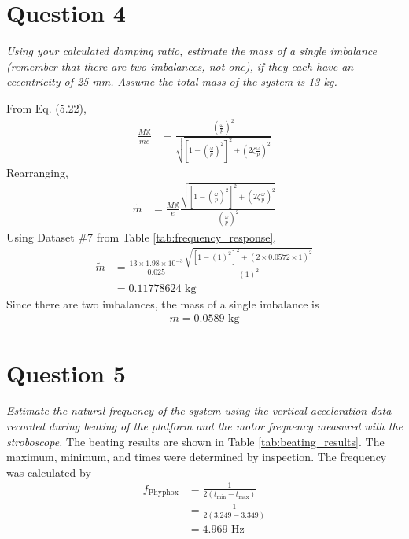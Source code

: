 \section{Question 4}
\textit{Using your calculated damping ratio, estimate the mass of a single imbalance (remember that there are two imbalances, not one), if they each have an eccentricity of 25 mm. Assume the total mass of the system is 13 kg.}

From Eq. (5.22),
\begin{align*}
    \frac{M \mathbb{X}}{\tilde{m}e} &= \frac{\left(\frac{\omega}{p}\right)^2}{\sqrt{\left[1 - \left(\frac{\omega}{p}\right)^2\right]^2 + \left(2\zeta\frac{\omega}{p}\right)^2}} 
\end{align*}
Rearranging,
\begin{align*}
    \tilde{m} &= \frac{M \mathbb{X}}{e} \frac{\sqrt{\left[1 - \left(\frac{\omega}{p}\right)^2\right]^2 + \left(2\zeta\frac{\omega}{p}\right)^2}}{\left(\frac{\omega}{p}\right)^2} 
\end{align*}
Using Dataset \#7 from Table \ref{tab:frequency_response}, 
\begin{align*}
    \tilde{m} &= \frac{13 \times 1.98 \times 10^{-3}}{0.025} \frac{\sqrt{\left[1 - \left(1\right)^2\right]^2 + \left(2 \times 0.0572 \times 1\right)^2}}{\left(1\right)^2} \\
    &= 0.11778624 \text{ kg}
\end{align*}
Since there are two imbalances, the mass of a single imbalance is 
\begin{align*}
    \boxed{m = 0.0589 \text{ kg}}
\end{align*}

\section{Question 5}
\textit{Estimate the natural frequency of the system using the vertical acceleration data recorded during beating of the platform and the motor frequency measured with the stroboscope.}
The beating results are shown in Table \ref{tab:beating_results}. The maximum, minimum, and times were determined by inspection. The frequency was calculated by
\begin{align*}
    f_{\text{Phyphox}} &= \frac{1}{2(t_{\text{min}} - t_{\text{max}})} \\
    &= \frac{1}{2(3.249 - 3.349)} \\
    &= \boxed{4.969 \text{ Hz}}
\end{align*}

